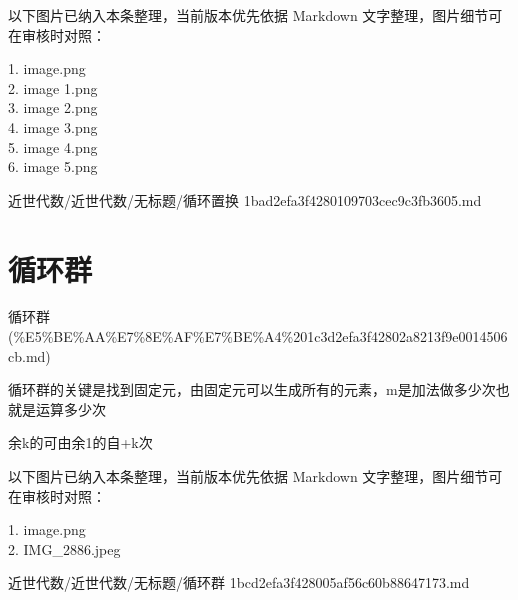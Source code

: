 \begin{note}[关联图片]
以下图片已纳入本条整理，当前版本优先依据 Markdown 文字整理，图片细节可在审核时对照：

1. image.png\\
2. image 1.png\\
3. image 2.png\\
4. image 3.png\\
5. image 4.png\\
6. image 5.png\\

\end{note}

\begin{note}[来源路径]

近世代数/近世代数/无标题/循环置换 1bad2efa3f4280109703cec9c3fb3605.md

\end{note}

\section*{循环群}

\begin{note}[来源上级主题]

循环群 (\%E5\%BE\%AA\%E7\%8E\%AF\%E7\%BE\%A4\%201c3d2efa3f42802a8213f9e0014506cb.md)

\end{note}

\begin{note}[循环群]

循环群的关键是找到固定元，由固定元可以生成所有的元素，m是加法做多少次也就是运算多少次

余k的可由余1的自+k次

\end{note}

\begin{note}[关联图片]
以下图片已纳入本条整理，当前版本优先依据 Markdown 文字整理，图片细节可在审核时对照：

1. image.png\\
2. IMG\_2886.jpeg\\

\end{note}

\begin{note}[来源路径]

近世代数/近世代数/无标题/循环群 1bcd2efa3f428005af56c60b88647173.md

\end{note}

